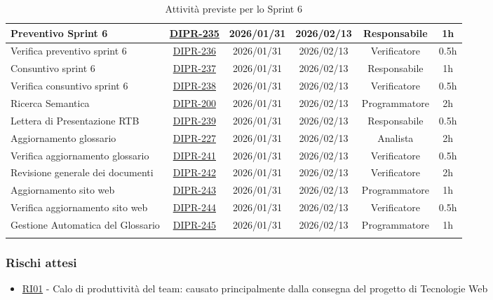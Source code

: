\documentclass[a4paper,12pt]{article}
\begin{document}
\begin{longtable}{|p{4cm}|c|c|c|c|c|}
        \hline
        Preventivo Sprint 6 & \href{https://7zpus.atlassian.net/browse/DIPR-235}{DIPR-235} & 2026/01/31 & 2026/02/13 & Responsabile & 1h \\
        \hline
        Verifica preventivo sprint 6 & \href{https://7zpus.atlassian.net/browse/DIPR-236}{DIPR-236} & 2026/01/31 & 2026/02/13 & Verificatore & 0.5h \\
        \hline
        Consuntivo sprint 6 & \href{https://7zpus.atlassian.net/browse/DIPR-237}{DIPR-237} & 2026/01/31 & 2026/02/13 & Responsabile & 1h \\
        \hline
        Verifica consuntivo sprint 6 & \href{https://7zpus.atlassian.net/browse/DIPR-238}{DIPR-238} & 2026/01/31 & 2026/02/13 & Verificatore & 0.5h \\
        \hline
        Ricerca Semantica & \href{https://7zpus.atlassian.net/browse/DIPR-200}{DIPR-200} & 2026/01/31 & 2026/02/13 & Programmatore & 2h \\
        \hline
        Lettera di Presentazione RTB & \href{https://7zpus.atlassian.net/browse/DIPR-239}{DIPR-239} & 2026/01/31 & 2026/02/13 & Responsabile & 0.5h \\
        \hline
        Aggiornamento glossario & \href{https://7zpus.atlassian.net/browse/DIPR-227}{DIPR-227} & 2026/01/31 & 2026/02/13 & Analista & 2h \\
        \hline
        Verifica aggiornamento glossario & \href{https://7zpus.atlassian.net/browse/DIPR-241}{DIPR-241} & 2026/01/31 & 2026/02/13 & Verificatore & 0.5h \\
        \hline
        Revisione generale dei documenti & \href{https://7zpus.atlassian.net/browse/DIPR-242}{DIPR-242} & 2026/01/31 & 2026/02/13 & Verificatore & 2h \\
        \hline
        Aggiornamento sito web & \href{https://7zpus.atlassian.net/browse/DIPR-243}{DIPR-243} & 2026/01/31 & 2026/02/13 & Programmatore & 1h \\
        \hline
        Verifica aggiornamento sito web & \href{https://7zpus.atlassian.net/browse/DIPR-244}{DIPR-244} & 2026/01/31 & 2026/02/13 & Verificatore & 0.5h \\
        \hline
        Gestione Automatica del Glossario & \href{https://7zpus.atlassian.net/browse/DIPR-245}{DIPR-245} & 2026/01/31 & 2026/02/13 & Programmatore & 1h \\
        \hline
    \caption{Attività previste per lo Sprint 6}
    \end{longtable}


\subsubsection{Rischi attesi}
\begin{itemize}
    \item \hyperref[RI01]{RI01} - Calo di produttività del team: causato principalmente dalla consegna del progetto di Tecnologie Web
\end{itemize}
\end{document}
